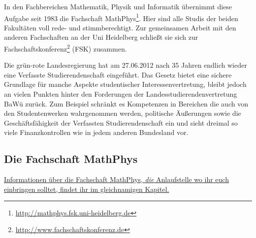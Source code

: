 In den Fachbereichen Mathematik, Physik und Informatik übernimmt diese Aufgabe seit 1983 die Fachschaft MathPhys\footnote{\url{http://mathphys.fsk.uni-heidelberg.de}}. Hier sind alle Studis der beiden Fakultäten voll rede- und stimmberechtigt. Zur gemeinsamen Arbeit mit den anderen Fachschaften an der Uni Heidelberg schließt sie sich zur Fachschaftskonferenz\footnote{\url{http://www.fachschaftskonferenz.de}} (FSK) zusammen. 

Die grün-rote Landesregierung hat am 27.06.2012 nach 35 Jahren endlich wieder eine Verfasste Studierendenschaft eingeführt. Das Gesetz bietet eine sichere Grundlage für manche Aspekte studentischer Interessenvertretung, bleibt jedoch an vielen Punkten hinter den Forderungen der Landesstudierendenvertretung BaWü zurück. Zum Beispiel schränkt es Kompetenzen in Bereichen die auch von den Studentenwerken wahrgenommen werden, politische Äußerungen sowie die Geschäftsfähigkeit der Verfassten Studierendenschaft ein und sieht dreimal so viele Finanzkontrollen wie in jedem anderen Bundesland vor.



\subsection{Die Fachschaft MathPhys}
\hyperref[diefsmathphys]{Informationen über die Fachschaft MathPhys, \emph{die} Anlaufstelle wo ihr euch einbringen solltet, findet ihr im gleichnamigen Kapitel.}

